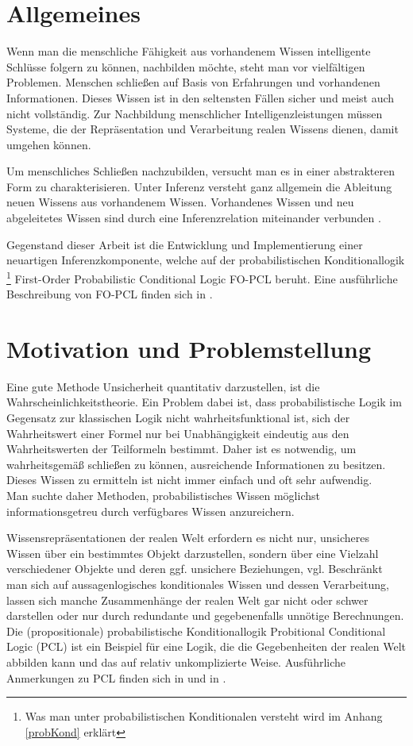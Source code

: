 \documentclass[a4paper, 11pt]{book}
\begin{document}
\section{Allgemeines}

Wenn man die menschliche Fähigkeit aus vorhandenem Wissen intelligente Schlüsse folgern zu können, nachbilden möchte, steht man vor vielfältigen Problemen. Menschen schließen auf Basis von Erfahrungen und vorhandenen Informationen. Dieses Wissen ist in den seltensten Fällen sicher und meist auch nicht vollständig. Zur Nachbildung menschlicher Intelligenzleistungen müssen Systeme, die der Repräsentation und Verarbeitung realen Wissens dienen, damit umgehen können.

Um menschliches Schließen nachzubilden, versucht man es in einer abstrakteren Form zu charakterisieren. Unter Inferenz versteht ganz allgemein die Ableitung neuen Wissens aus vorhandenem Wissen. Vorhandenes Wissen und neu abgeleitetes Wissen sind durch eine Inferenzrelation miteinander verbunden 
\cite[S. 20]{BKI08}.

Gegenstand dieser Arbeit ist die Entwicklung und Implementierung einer neuartigen Inferenzkomponente, welche auf der probabilistischen Konditionallogik \footnote{Was man unter probabilistischen Konditionalen versteht wird im Anhang \ref{probKond} erklärt } First-Order Probabilistic Conditional Logic FO-PCL  beruht. Eine ausführliche Beschreibung von FO-PCL finden sich in \cite[Kap. 6]{Fis10}. 

\section{Motivation und Problemstellung}

Eine gute Methode Unsicherheit quantitativ darzustellen, ist die Wahrscheinlichkeitstheorie. Ein Problem dabei ist, dass probabilistische Logik im Gegensatz zur klassischen Logik nicht wahrheitsfunktional ist, sich der Wahrheitswert einer Formel nur bei Unabhängigkeit  eindeutig aus den Wahrheitswerten der Teilformeln bestimmt. Daher ist es notwendig, um wahrheitsgemäß schließen zu können, ausreichende Informationen zu besitzen. Dieses Wissen zu ermitteln ist nicht immer einfach und oft sehr aufwendig.\\
Man suchte daher Methoden, probabilistisches Wissen möglichst informationsgetreu durch verfügbares Wissen anzureichern. 

Wissensrepräsentationen der realen Welt erfordern es nicht nur, unsicheres Wissen über ein bestimmtes Objekt darzustellen, sondern über eine Vielzahl verschiedener Objekte und deren ggf. unsichere Beziehungen, vgl. \cite[S. 19]{Fis09}
Beschränkt man sich auf aussagenlogisches konditionales Wissen und dessen Verarbeitung, lassen sich manche Zusammenhänge der realen Welt gar nicht oder schwer darstellen oder nur durch redundante und gegebenenfalls unnötige Berechnungen. Die (propositionale) probabilistische Konditionallogik Probitional Conditional Logic (PCL)  ist ein Beispiel für eine Logik, die die Gegebenheiten der realen Welt abbilden kann und das auf relativ unkomplizierte Weise. Ausführliche Anmerkungen zu PCL finden sich in \cite{RKI96} und in \cite[Kap. 2.4]{Fis10}. 
\end{document}
